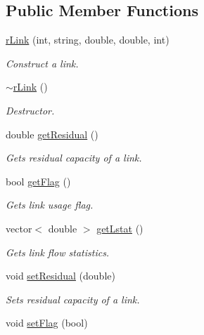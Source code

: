 \subsection*{Public Member Functions}
\begin{DoxyCompactItemize}
\item 
\hyperlink{classrLink_acd7f5f66409693e86cd33e4a6e6964b8}{rLink} (int, string, double, double, int)
\begin{DoxyCompactList}\small\item\em Construct a link. \item\end{DoxyCompactList}\item 
\hyperlink{classrLink_ac2f6e30278ba2967b96086435711f672}{$\sim$rLink} ()
\begin{DoxyCompactList}\small\item\em Destructor. \item\end{DoxyCompactList}\item 
double \hyperlink{classrLink_aa840b5668425c224a451ec1663754a82}{getResidual} ()
\begin{DoxyCompactList}\small\item\em Gets residual capacity of a link. \item\end{DoxyCompactList}\item 
bool \hyperlink{classrLink_a4639d6b69acbb669d0cbb7af5cbf152b}{getFlag} ()
\begin{DoxyCompactList}\small\item\em Gets link usage flag. \item\end{DoxyCompactList}\item 
vector$<$ double $>$ \hyperlink{classrLink_a86c80f0a22f7703601d8a242c2fb471f}{getLstat} ()
\begin{DoxyCompactList}\small\item\em Gets link flow statistics. \item\end{DoxyCompactList}\item 
void \hyperlink{classrLink_a7ac5fdbd1b4fc92cbfd5d8e421477148}{setResidual} (double)
\begin{DoxyCompactList}\small\item\em Sets residual capacity of a link. \item\end{DoxyCompactList}\item 
void \hyperlink{classrLink_a15022659ea92d086138f817203ede689}{setFlag} (bool)

\end{DoxyCompactItemize}
